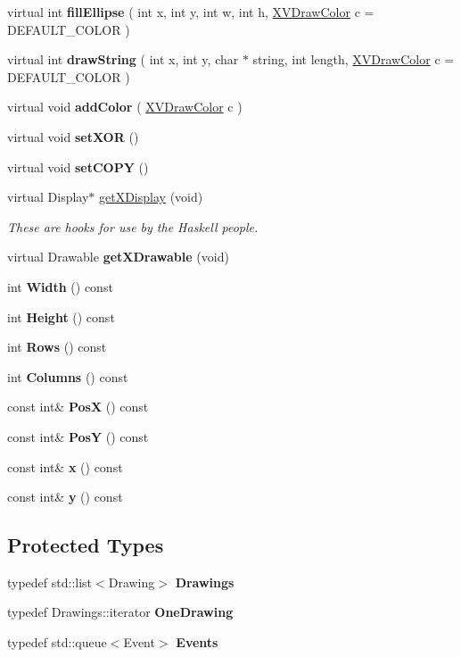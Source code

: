 \begin{CompactItemize}
\item 
\label{XVRemoteWindowX_a25}
\hypertarget{class_XVRemoteWindowX_a25}{
virtual int {\bf fill\-Ellipse} ( int x, int y, int w, int h, \hyperlink{class_XVDrawColor}{XVDraw\-Color} c = DEFAULT\_\-COLOR )}

\item 
\label{XVRemoteWindowX_a26}
\hypertarget{class_XVRemoteWindowX_a26}{
virtual int {\bf draw\-String} ( int x, int y, char $\ast$ string, int length, \hyperlink{class_XVDrawColor}{XVDraw\-Color} c = DEFAULT\_\-COLOR )}

\item 
virtual void {\bf add\-Color} ( \hyperlink{class_XVDrawColor}{XVDraw\-Color} c )
\item 
virtual void {\bf set\-XOR} ()
\item 
virtual void {\bf set\-COPY} ()
\item 
virtual Display$\ast$ \hyperlink{class_XVRemoteWindowX_a30}{get\-XDisplay} (void)
\begin{CompactList}\small\item\em These are hooks for use by the Haskell people.\item\end{CompactList}\item 
virtual Drawable {\bf get\-XDrawable} (void)
\item 
int {\bf Width} () const
\item 
int {\bf Height} () const
\item 
int {\bf Rows} () const
\item 
int {\bf Columns} () const
\item 
const int\& {\bf Pos\-X} () const
\item 
const int\& {\bf Pos\-Y} () const
\item 
const int\& {\bf x} () const
\item 
const int\& {\bf y} () const
\end{CompactItemize}
\subsection*{Protected Types}
\begin{CompactItemize}
\item 
typedef std::list$<$Drawing$>$ {\bf Drawings}
\item 
typedef Drawings::iterator {\bf One\-Drawing}
\item 
typedef std::queue$<$Event$>$ {\bf Events}
\end{CompactItemize}
